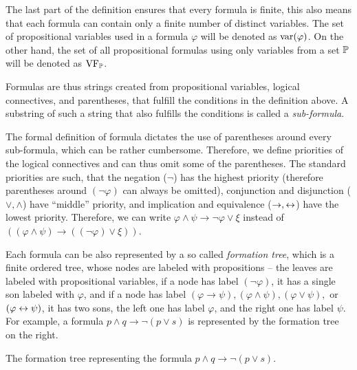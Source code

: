 The last part of the definition ensures that every formula is finite, this also means that each formula can contain only a finite number of distinct variables. The set of propositional variables used in a formula $\varphi$ will be denoted as $\operatorname{var}(\varphi)$. On the other hand, the set of all propositional formulas using only variables from a set $\mathbb{P}$ will be denoted as $\operatorname{VF}_\mathbb{P}$.

Formulas are thus strings created from propositional variables, logical connectives, and parentheses, that fulfill the conditions in the definition above. A substring of such a string that also fulfills the conditions is called a \emph{sub-formula}. 

The formal definition of formula dictates the use of parentheses around every sub-formula, which can be rather cumbersome. Therefore, we define priorities of the logical connectives and can thus omit some of the parentheses. The standard priorities are such, that the negation ($\neg$) has the highest priority (therefore parentheses around $(\neg \varphi)$ can always be omitted), conjunction and disjunction ($\lor, \land$) have ``middle'' priority, and implication and equivalence ($\to, \leftrightarrow$) have the lowest priority. Therefore, we can write $\varphi \land \psi \to \neg \varphi \lor \xi$ instead of $((\varphi \land \psi) \to ((\neg \varphi) \lor \xi))$. 

Each formula can be also represented by a so called \emph{formation tree}, which is a finite ordered tree, whose nodes are labeled with propositions -- the leaves are labeled with propositional variables, if a node has label $(\neg \varphi)$, it has a single son labeled with $\varphi$, and if a node has label $(\varphi \to \psi), (\varphi \land \psi), (\varphi \lor \psi),$ or $(\varphi \leftrightarrow \psi)$, it has two sons, the left one has label $\varphi$, and the right one has label $\psi$. For example, a formula $p \land q \to \neg (p \lor s)$ is represented by the formation tree on the right.
\begin{marginfigure}[-4\baselineskip]
\centering
{}
\caption{The formation tree representing the formula $p \land q \to \neg (p \lor s)$.}
\end{marginfigure}

